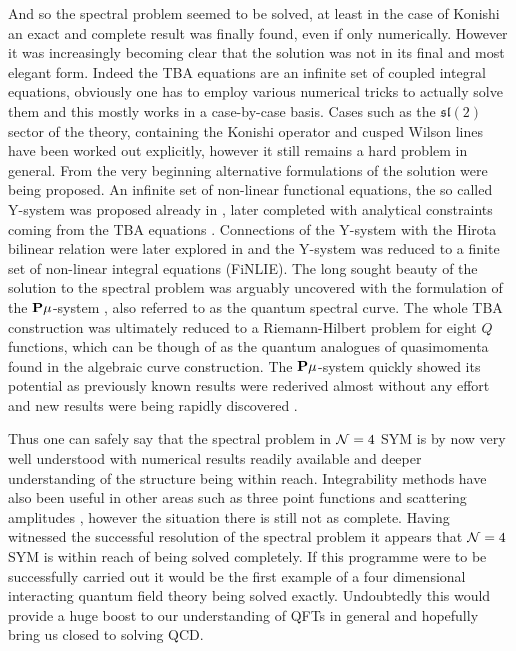 And so the spectral problem seemed to be solved, at least in the case of Konishi an exact and complete result was finally found, even if only numerically.
However it was increasingly becoming clear that the solution was not in its final and most elegant form.
Indeed the TBA equations are an infinite set of coupled integral equations, obviously one has to employ various numerical tricks to actually solve them and this mostly works in a case-by-case basis. 
Cases such as the $\mathfrak{sl}(2)$ sector of the theory, containing the Konishi operator \cite{Gromov:2009bc} and cusped Wilson lines \cite{Correa:2012hh, Gromov:2012eu} have been worked out explicitly, however it still remains a hard problem in general.
From the very beginning alternative formulations of the solution were being proposed. 
An infinite set of non-linear functional equations, the so called Y-system was proposed already in \cite{Gromov:2009bc}, later completed with analytical constraints coming from the TBA equations \cite{Cavaglia:2010nm}.
Connections of the Y-system with the Hirota bilinear relation were later explored in \cite{Gromov:2011cx} and the Y-system was reduced to a finite set of non-linear integral equations (FiNLIE).
The long sought beauty of the solution to the spectral problem was arguably uncovered with the formulation of the ${\bf P}\mu$-system \cite{Gromov:2013pga}, also referred to as the quantum spectral curve.
The whole TBA construction was ultimately reduced to a Riemann-Hilbert problem for eight $Q$ functions, which can be though of as the quantum analogues of quasimomenta found in the algebraic curve construction.
The ${\bf P}\mu$-system quickly showed its potential as previously known results were rederived almost without any effort and new results were being rapidly discovered \cite{Gromov:2013qga, Gromov:2014bva}.

Thus one can safely say that the spectral problem in $\mathcal{N}=4$ SYM is by now very well understood with numerical results readily available and deeper understanding of the structure being within reach.
Integrability methods have also been useful in other areas such as three point functions \cite{Escobedo:2010xs, Gromov:2012vu} and scattering amplitudes \cite{Drummond:2010km, Alday:2010kn}, however the situation there is still not as complete.
Having witnessed the successful resolution of the spectral problem it appears that $\mathcal{N}=4$ SYM is within reach of being solved completely.
If this programme were to be successfully carried out it would be the first example of a four dimensional interacting quantum field theory being solved exactly.
Undoubtedly this would provide a huge boost to our understanding of QFTs in general and hopefully bring us closed to solving QCD.


